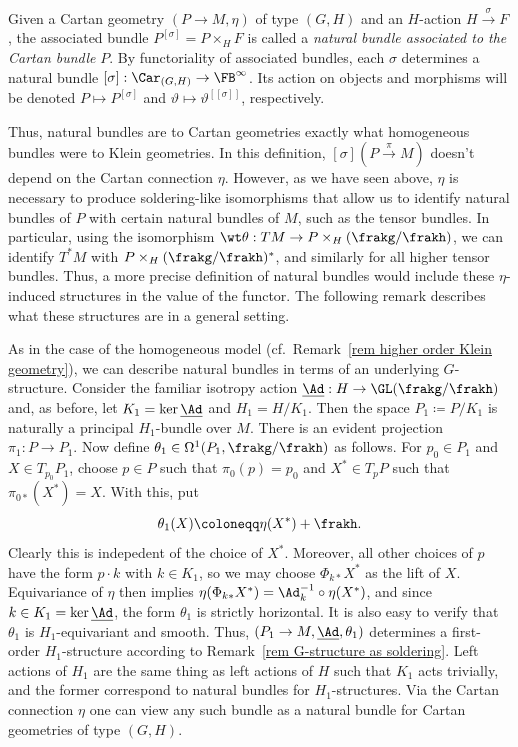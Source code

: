 \begin{defn}
    Given a Cartan geometry $(P\to M,\eta)$ of type $(G,H)$ and an $H$-action $H\overset{\sigma}{\to}F$, the associated bundle $P^{[\sigma]}=P\times_H F$ is called a \emph{natural bundle associated to the Cartan bundle} $P$. By functoriality of associated bundles, each $\sigma$ determines a natural bundle $[\sigma]:\Car_{(G,H)}\to \FB^\infty$. Its action on objects and morphisms will be denoted $P\mapsto P^{[\sigma]}$ and $\vartheta\mapsto \vartheta^[{[\sigma]}]$, respectively.
\end{defn}

Thus, natural bundles are to Cartan geometries exactly what homogeneous bundles were to Klein geometries. In this definition, $[\sigma](P\overset{\pi}{\to} M)$ doesn't depend on the Cartan connection $\eta$. However, as we have seen above, $\eta$ is necessary to produce soldering-like isomorphisms that allow us to identify natural bundles of $P$ with certain natural bundles of $M$, such as the tensor bundles. In particular, using the isomorphism $\wt\theta:TM\to P\times_H(\frakg\slash\frakh)$, we can identify $T^\ast M$ with $P\times_H(\frakg\slash\frakh)^\ast$, and similarly for all higher tensor bundles. Thus, a more precise definition of natural bundles would include these $\eta$-induced structures in the value of the functor. The following remark describes what these structures are in a general setting.

\begin{rem}
    As in the case of the homogeneous model (cf.\ Remark~\ref{rem higher order Klein geometry}), we can describe natural bundles in terms of an underlying $G$-structure. Consider the familiar isotropy action $\underline{\Ad}:H\to \GL(\frakg\slash\frakh)$ and, as before, let $K_1=\ker \underline{\Ad}$ and $H_1=H\slash K_1$. Then the space $P_1\coloneqq P\slash K_1$ is naturally a principal $H_1$-bundle over $M$. There is an evident projection $\pi_1:P\to P_1$. Now define $\theta_1\in\Omega^1(P_1,\frakg\slash\frakh)$ as follows. For $p_0\in P_1$ and $X\in T_{p_0}P_1$, choose $p\in P$ such that $\pi_0(p)=p_0$ and $X^\ast\in T_p P$ such that $\pi_{0\ast}(X^\ast)=X$. With this, put 
    \[\theta_1(X)\coloneqq \eta(X^\ast)+\frakh.\]
    Clearly this is indepedent of the choice of $X^\ast$. Moreover, all other choices of $p$ have the form $p\cdot k$ with $k\in K_1$, so we may choose $\Phi_{k\ast}X^\ast$ as the lift of $X$. Equivariance of $\eta$ then implies $\eta(\Phi_{k\ast }X^\ast)=\Ad_k^{-1}\circ \eta(X^\ast)$, and since $k\in K_1=\ker \underline{\Ad}$, the form $\theta_1$ is strictly horizontal. It is also easy to verify that $\theta_1$ is $H_1$-equivariant and smooth. Thus, $(P_1\to M,\underline{\Ad},\theta_1)$ determines a first-order $H_1$-structure according to Remark~\ref{rem G-structure as soldering}. Left actions of $H_1$ are the same thing as left actions of $H$ such that $K_1$ acts trivially, and the former correspond to natural bundles for $H_1$-structures. Via the Cartan connection $\eta$ one can view any such bundle as a natural bundle for Cartan geometries of type $(G,H)$.
\end{rem}


